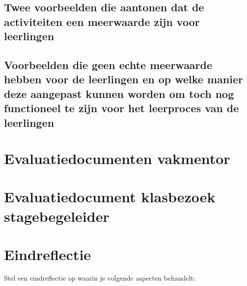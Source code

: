 \documentclass[a4paper,12pt,twoside]{article}%
\begin{document}
	\subsection{Twee voorbeelden die aantonen dat de activiteiten een meerwaarde zijn voor leerlingen}
	
	
	\subsection{Voorbeelden die geen echte meerwaarde hebben voor de  leerlingen en op welke manier deze aangepast kunnen worden om toch nog functioneel te zijn voor het leerproces van de leerlingen}
	
	
	
	
	
	
	\section{Evaluatiedocumenten vakmentor}
	
	
	
	
	
	
	
	
	
	
	

	
	
	
	\section{Evaluatiedocument klasbezoek stagebegeleider}
	
	\section{Eindreflectie}
	Stel een eindreflectie op waarin je volgende aspecten behandelt: 
	
\end{document}

